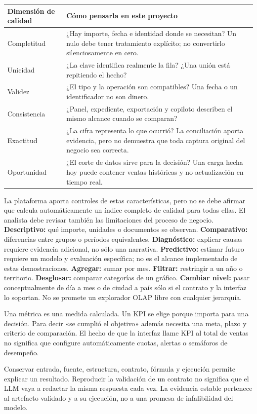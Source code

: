 \begin{tabularx}{\linewidth}{@{}p{33mm}Y@{}}
\toprule
\textbf{Dimensión de calidad}&\textbf{Cómo pensarla en este proyecto}\\
\midrule
Completitud&¿Hay importe, fecha e identidad donde se necesitan? Un nulo debe tener tratamiento explícito; no convertirlo silenciosamente en cero.\\
Unicidad&¿La clave identifica realmente la fila? ¿Una unión está repitiendo el hecho?\\
Validez&¿El tipo y la operación son compatibles? Una fecha o un identificador no son dinero.\\
Consistencia&¿Panel, expediente, exportación y copiloto describen el mismo alcance cuando se comparan?\\
Exactitud&¿La cifra representa lo que ocurrió? La conciliación aporta evidencia, pero no demuestra que toda captura original del negocio sea correcta.\\
Oportunidad&¿El corte de datos sirve para la decisión? Una carga hecha hoy puede contener ventas históricas y no actualización en tiempo real.\\
\bottomrule
\end{tabularx}
La plataforma aporta controles de estas características, pero no se debe afirmar que calcula automáticamente un índice completo de calidad para todas ellas. El analista debe revisar también las limitaciones del proceso de negocio.
\textbf{Descriptivo:} qué importe, unidades o documentos se observan. \textbf{Comparativo:} diferencias entre grupos o períodos equivalentes. \textbf{Diagnóstico:} explicar causas requiere evidencia adicional, no sólo una narrativa. \textbf{Predictivo:} estimar futuro requiere un modelo y evaluación específica; no es el alcance implementado de estas demostraciones.
\textbf{Agregar:} sumar por mes. \textbf{Filtrar:} restringir a un año o territorio. \textbf{Desglosar:} comparar categorías de un gráfico. \textbf{Cambiar nivel:} pasar conceptualmente de día a mes o de ciudad a país sólo si el contrato y la interfaz lo soportan. No se promete un explorador OLAP libre con cualquier jerarquía.
\begin{note}
Una métrica es una medida calculada. Un KPI se elige porque importa para una decisión. Para decir «se cumplió el objetivo» además necesita una meta, plazo y criterio de comparación. El hecho de que la interfaz llame KPI al total de ventas no significa que configure automáticamente cuotas, alertas o semáforos de desempeño.
\end{note}
Conservar entrada, fuente, estructura, contrato, fórmula y ejecución permite explicar un resultado. Reproducir la validación de un contrato no significa que el LLM vaya a redactar la misma respuesta cada vez. La evidencia estable pertenece al artefacto validado y a su ejecución, no a una promesa de infalibilidad del modelo.

